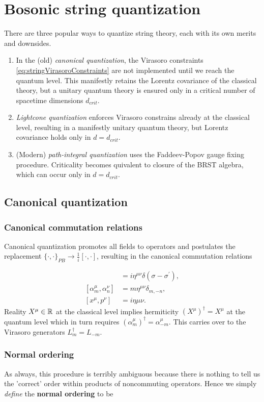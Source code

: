 \section{Bosonic string quantization}
There are three popular ways to quantize string theory, each with its own merits and downsides.
\begin{enumerate}
	\item In the (old) \emph{canonical quantization}, the Virasoro constraints \ref{eq:stringVirasoroConstraints} are not implemented until we reach the quantum level. This manifestly retains the Lorentz covariance of the classical theory, but a unitary quantum theory is ensured only in a critical number of spacetime dimensions $d_{crit}$.
	\item \emph{Lightcone quantization} enforces Virasoro constrains already at the classical level, resulting in a manifestly unitary quantum theory, but Lorentz covariance holds only in $d = d_{crit}$.
	\item (Modern) \emph{path-integral quantization} uses the Faddeev-Popov gauge fixing procedure. Criticality becomes quivalent to closure of the BRST algebra, which can occur only in $d=d_{crit}$.
\end{enumerate}
\subsection{Canonical quantization}
\subsubsection{Canonical commutation relations}
Canonical quantization promotes all fields to operators and postulates the replacement $\{\cdot,\cdot \}_{PB}\rightarrow \frac{1}{i} [\cdot,\cdot]$, resulting in the canonical commutation relations

\begin{align*}
	[X^\mu(\tau,\sigma),\Pi^\nu (\tau,\sigma^\prime)] &= i \eta^{\mu \nu} \delta(\sigma-\sigma^\prime),\\
	[\alpha^\mu_m,\alpha^\nu_n] &= m \eta^{\mu \nu} \delta_{m,-n}, \\
	[x^\mu,p^\nu] &= i \eta{ \mu \nu}.
\end{align*}
Reality $X^\mu \in \mathbb{R}$ at the classical level implies hermiticity $(X^\mu)^\dagger = X^\mu$ at the quantum level which in turn requires $(\alpha^\mu_m)^\dagger=\alpha^\mu_{-m}$. This carries over to the Virasoro generators $L^\dagger_m= L_{-m}$.

\subsubsection{Normal ordering}
As always, this procedure is terribly ambiguous because there is nothing to tell us the ’correct’ order within products of noncommuting operators. Hence we simply \emph{define} the \textbf{normal ordering} to be 


